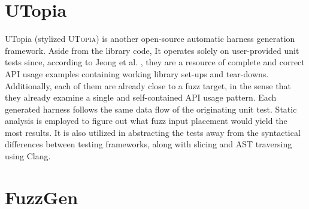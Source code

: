 \documentclass[
  a4paper,
]{scrreprt}
\theoremstyle{definition}
\theoremstyle{remark}
\begin{document}
\section{UTopia}\label{utopia}

UTopia \autocite{utopia} (stylized \textsc{UTopia}) is another
open-source automatic harness generation framework. Aside from the
library code, It operates solely on user-provided unit tests since,
according to Jeong et al. \autocite{utopia}, they are a resource of
complete and correct API usage examples containing working library
set-ups and tear-downs. Additionally, each of them are already close to
a fuzz target, in the sense that they already examine a single and
self-contained API usage pattern. Each generated harness follows the
same data flow of the originating unit test. Static analysis is employed
to figure out what fuzz input placement would yield the most results. It
is also utilized in abstracting the tests away from the syntactical
differences between testing frameworks, along with slicing and AST
traversing using Clang.

\section{FuzzGen}\label{fuzzgen}
\end{document}
